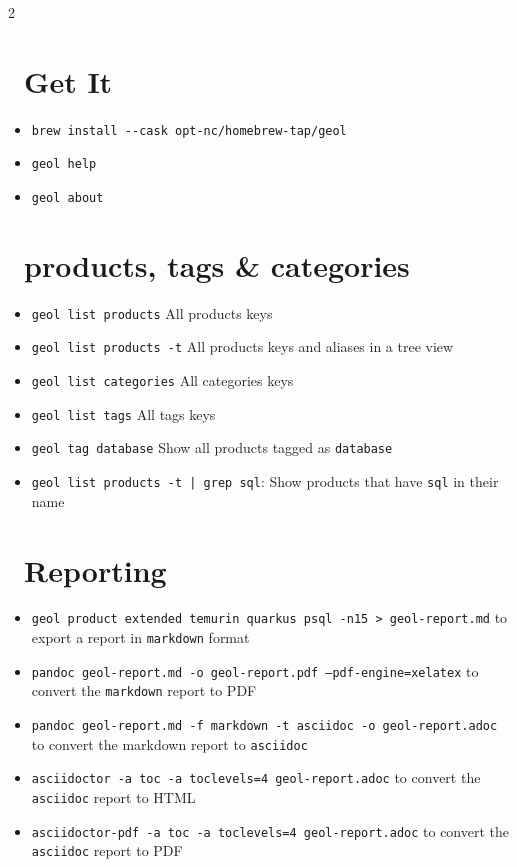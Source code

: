 \documentclass[a4paper,10pt]{article}
\newcommand{\cmd}[1]{\textcolor{geolgreen}{\texttt{#1}}}
\newenvironment{geolitemize}{%
  \begin{itemize}\setlength{\itemsep}{0.1em}\setlength{\parskip}{0pt}\setlength{\topsep}{0pt}
}{\end{itemize}}
\begin{document}
\begin{multicols}{2}

\section*{\faTerminal\ Get It}

\begin{geolbox}
\begin{geolitemize}
  \item \cmd{brew install -{}-cask opt-nc/homebrew-tap/geol}
  \item \cmd{geol help}
  \item \cmd{geol about}
\end{geolitemize}
\end{geolbox}


\section*{\faTags\ products, tags \& categories}

\begin{geolbox}
\begin{geolitemize}
  \item \cmd{geol list products} All products keys
  \item \cmd{geol list products -t} All products keys and aliases in a tree view
  \item \cmd{geol list categories} All categories keys
  \item \cmd{geol list tags} All tags keys
  \item \cmd{geol tag database} Show all products tagged as \cmd{database} 
  \item \cmd{geol list products -t | grep sql}: Show products that have \cmd{sql} in their name
\end{geolitemize}
\end{geolbox}

\section*{\faShareSquare\ Reporting}
\begin{geolbox}
\begin{geolitemize}
  \item \cmd{geol product extended temurin quarkus psql -n15 > geol-report.md} to export a report in \cmd{markdown} format 
  \item \cmd{pandoc geol-report.md -o geol-report.pdf --pdf-engine=xelatex} to convert the \cmd{markdown} report to PDF
  \item \cmd{pandoc geol-report.md -f markdown -t asciidoc -o geol-report.adoc} to convert the markdown report to \cmd{asciidoc}
  \item \cmd{asciidoctor -a toc -a toclevels=4 geol-report.adoc} to convert the \cmd{asciidoc} report to HTML
  \item \cmd{asciidoctor-pdf -a toc -a toclevels=4 geol-report.adoc} to convert the \cmd{asciidoc} report to PDF
\end{geolitemize}
\end{geolbox}



\end{multicols}
\end{document}

